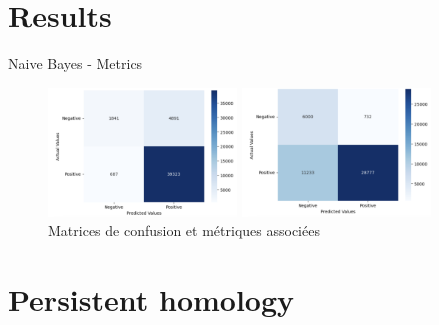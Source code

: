 \documentclass{beamer}
\begin{document}
\section{Results}
\begin{frame}{Naive Bayes - Metrics}

\begin{figure}[H]
    \begin{minipage}[c]{0.49\textwidth}
        \includegraphics[width=5cm]{nb_mat_no_undersampling.png} 
    \end{minipage}
    \begin{minipage}[c]{0.49\textwidth}
        \includegraphics[width=5cm]{nb_mat_undersampling.png}
    \end{minipage}
    \caption{Matrices de confusion et métriques associées}
\end{figure}

\begin{table}
\centering
{}
\caption{Metrics}
\label{subfig:scores}
\end{table}
\end{frame}

\section{Persistent homology}
\end{document}
